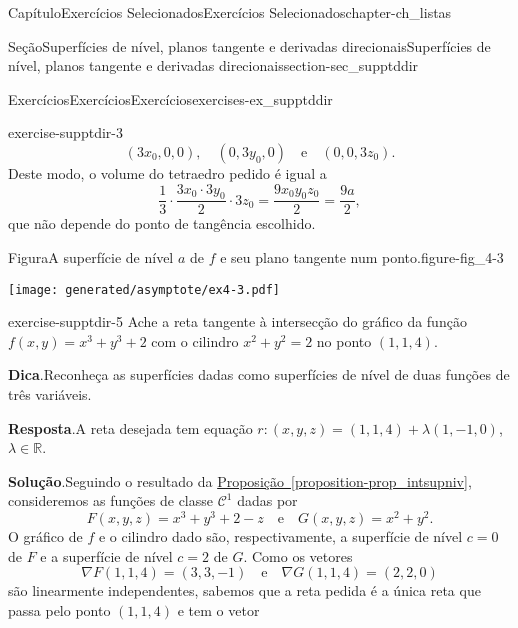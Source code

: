 \documentclass[oneside,10pt,]{book}
\newcommand{\blocktitlefont}{\relax}
\newcommand{\xreffont}{\relax}
\numberwithin{equation}{section}
\begin{document}
\begin{chapterptx}{Capítulo}{Exercícios Selecionados}{}{Exercícios Selecionados}{}{}{chapter-ch_listas}
\begin{sectionptx}{Seção}{Superfícies de nível, planos tangente e derivadas direcionais}{}{Superfícies de nível, planos tangente e derivadas direcionais}{}{}{section-sec_supptddir}
\begin{exercises-subsection-numberless}{Exercícios}{Exercícios}{}{Exercícios}{}{}{exercises-ex_supptddir}
\begin{divisionexercise}{3}{}{}{exercise-supptdir-3}
\begin{equation*}
(3x_0,0,0), \quad (0,3y_0,0) \quad \text{e} \quad
(0,0,3z_0).
\end{equation*}
Deste modo, o volume do tetraedro pedido é igual a%
\begin{equation*}
\frac{1}{3} \cdot \frac{3x_0 \cdot 3y_0}{2} \cdot 3z_0 =
\frac{9x_0y_0z_0}{2} = \frac{9a}{2},
\end{equation*}
que não depende do ponto de tangência escolhido. \begin{figureptx}{Figura}{A superfície de nível \(a\) de \(f\) e seu plano tangente num ponto.}{figure-fig_4-3}{}%
\begin{image}{0.25}{0.5}{0.25}{}%
\texttt{[image: generated/asymptote/ex4-3.pdf]}
\end{image}%
\tcblower
\end{figureptx}%
%
\end{divisionexercise}%
\begin{divisionexercise}{5}{}{}{exercise-supptdir-5}%
Ache a reta tangente à intersecção do gráfico da função \(f(x,y) = x^3+y^3+2\) com o cilindro \(x^2+y^2=2\) no ponto \((1,1,4)\).%
\par\smallskip%
\noindent\textbf{\blocktitlefont Dica}.\hypertarget{hint-supptdir-5-b}{}\quad{}Reconheça as superfícies dadas como superfícies de nível de duas funções de três variáveis.%
\par\smallskip%
\noindent\textbf{\blocktitlefont Resposta}.\hypertarget{answer-supptdir-5-c}{}\quad{}A reta desejada tem equação \(r\colon (x,y,z) = (1,1,4) +
\lambda (1,-1,0)\), \(\lambda \in \mathbb{R}\).%
\par\smallskip%
\noindent\textbf{\blocktitlefont Solução}.\hypertarget{solution-supptdir-5-d}{}\quad{}Seguindo o resultado da \hyperref[proposition-prop_intsupniv]{Proposição~{\xreffont\ref{proposition-prop_intsupniv}}}, consideremos as funções de classe \(\mathscr{C}^1\) dadas por%
\begin{equation*}
F(x,y,z) = x^3 + y^3 +2 - z \quad \text{e} \quad G(x,y,z) =
x^2 + y^2.
\end{equation*}
O gráfico de \(f\) e o cilindro dado são, respectivamente, a superfície de nível \(c=0\) de \(F\) e a superfície de nível \(c=2\) de \(G\). Como os vetores%
\begin{equation*}
\nabla F(1,1,4) = (3,3, -1) \quad \text{e} \quad \nabla
G(1,1,4) = (2,2,0)
\end{equation*}
são linearmente independentes, sabemos que a reta pedida é a única reta que passa pelo ponto \((1,1,4)\) e tem o vetor%

\end{divisionexercise}
\end{exercises-subsection-numberless}
\end{sectionptx}
\end{chapterptx}
\end{document}
